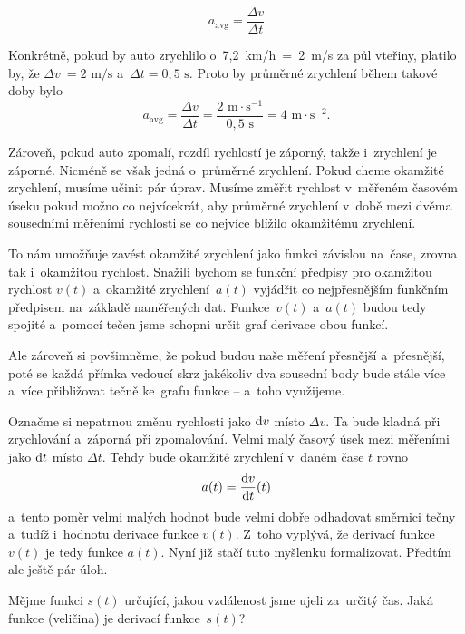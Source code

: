 \begin{equation*}
    a_{\text{avg}} = \frac{\Delta v}{\Delta t}
\end{equation*}

Konkrétně, pokud by auto zrychlilo o~7,2~km/h~=~2~m/s za půl vteřiny, platilo by, že
${\Delta v~= 2 \text{ m}/\text{s}}$ a~${\Delta t = 0,5 \text{ s}}$. Proto by průměrné
zrychlení během takové doby bylo
\begin{equation*}
    a_{\text{avg}}
    = \frac{\Delta v}{\Delta t}
    = \frac{2 \text{ m} \cdot \text{s}^{-1}}{0,5 \text{ s}}
    = 4 \text{ m} \cdot \text{s}^{-2}\text{.}
\end{equation*}

Zároveň, pokud auto zpomalí, rozdíl rychlostí je záporný, takže i~zrychlení je
záporné. Nicméně se však jedná o~průměrné zrychlení. Pokud cheme okamžité zrychlení,
musíme učinit pár úprav. Musíme změřit rychlost v~měřeném časovém úseku pokud možno
co nejvícekrát, aby průměrné zrychlení v~době mezi dvěma sousedními měřeními
rychlosti se co nejvíce blížilo okamžitému zrychlení.

To nám umožňuje zavést okamžité zrychlení jako funkci závislou na~čase, zrovna tak
i~okamžitou rychlost. Snažili bychom se funkční předpisy pro okamžitou rychlost
$v(t)$ a~okamžité zrychlení~$a(t)$ vyjádřit co nejpřesnějším funkčním předpisem
na~základě naměřených dat. Funkce~$v(t)$ a~$a(t)$ budou tedy spojité a~pomocí tečen
jsme schopni určit graf derivace obou funkcí.

Ale zároveň si povšimněme, že pokud budou naše měření přesnější a~přesnější, poté se
každá přímka vedoucí skrz jakékoliv dva sousední body bude stále více a~více
přibližovat tečně ke~grafu funkce -- a~toho využijeme.

Označme si nepatrnou změnu
rychlosti jako $\mathrm{d} v$ místo $\Delta v$. Ta bude kladná při zrychlování
a~záporná při zpomalování. Velmi malý časový úsek mezi měřeními jako $\mathrm{d} t$
místo $\Delta t$. Tehdy bude okamžité zrychlení v~daném čase $t$ rovno
\begin{equation*}
    a(t) = \frac{\mathrm{d} v}{\mathrm{d} t}(t)
\end{equation*}
a~tento poměr velmi malých hodnot bude velmi dobře odhadovat směrnici tečny a~tudíž
i~hodnotu derivace funkce $v(t)$. Z~toho vyplývá, že derivací funkce $v(t)$ je tedy
funkce $a(t)$. Nyní již stačí tuto myšlenku formalizovat. Předtím ale ještě pár úloh.

\begin{exercise}
    Mějme funkci $s(t)$ určující, jakou vzdálenost jsme ujeli za~určitý čas. Jaká
    funkce (veličina) je derivací funkce~$s(t)$?
\end{exercise}

